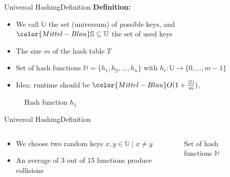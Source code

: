 
\begin{frame}{Universal Hashing}{Definition}
  \textbf{Definition:}
  \begin{itemize}
    \item<1->
      We call {\color{Mittel-Blau}$\mathbb{U}$} the set (universum) of
      possible keys, and $\color{Mittel-Blau}\mathbb{S}\subseteq \mathbb{U}$ the set of used keys
    \item<2->
      The size {\color{Mittel-Blau}$m$} of the hash table {\color{Mittel-Blau}$T$}
    \item<3->
      Set of hash functions {\color{Mittel-Blau}$\mathbb{H} = \{h_1, h_2,\dots, h_n\}$} with
      {\color{Mittel-Blau}$h_i: \mathbb{U} \to \{0,\dots, m - 1\}$}
    \item<5-> Idea: runtime should be $\color{Mittel-Blau} O(1+\frac{\vert \mathbb{S}
        \vert}{m})$, 
  \end{itemize}%
  \begin{figure}[!b]%
    \begin{adjustbox}{height=0.325\linewidth}%
    \end{adjustbox}
    \vspace*{-1.0em}%
    \caption{Hash function $h_1$}%
    \label{fig:universal_hashing:hash_function_definition}
  \end{figure}
\end{frame}


\begin{frame}{Universal Hashing}{Definition}
  \begin{columns}
    \begin{column}{0.5\linewidth}
      \begin{itemize}
        \item <1->
          We choose two random keys {\color{Mittel-Blau}$x, y \in \mathbb{U} \mid x \neq y$}
        \item <2->
          An average of 3 out of 15 functions produce collisions
      \end{itemize}
    \end{column}
    \begin{column}{0.5\linewidth}
      \begin{figure}[!t]%
        \begin{adjustbox}{width=\linewidth}
        \end{adjustbox}
        \caption{Set of hash functions $\mathbb{H}$}%
        \label{fig:universal_hashing:hash_universe}
      \end{figure}
    \end{column}
  \end{columns}
\end{frame}

